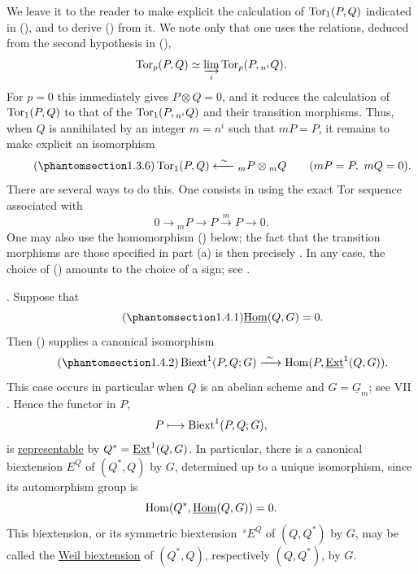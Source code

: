 We leave it to the reader to make explicit the calculation of
$\operatorname{Tor}_1(P,Q)$ indicated in (), and to derive () from it.
We note only that one uses the relations, deduced from the second
hypothesis in (),
\[
 \operatorname{Tor}_p(P,Q)\simeq
 \varinjlim_i\operatorname{Tor}_p(P,{}_{n^i}Q).
\]
For $p=0$ this immediately gives $P\otimes Q=0$, and it reduces the
calculation of $\operatorname{Tor}_1(P,Q)$ to that of the
$\operatorname{Tor}_1(P,{}_{n^i}Q)$ and their transition morphisms.  Thus, when
$Q$ is annihilated by an integer $m=n^i$ such that $mP=P$, it remains
to make explicit an isomorphism
\begin{equation}\tag{\SGARefTarget{sga7.sga7i.eviii.n1-3-6}{1.3.6}}
 \Tor_1(P,Q)
 \xleftarrow{\ \sim\ }
 {}_mP\otimes{}_mQ
 \qquad(mP=P,\ mQ=0).
\end{equation}
There are several ways to do this.  One consists in using the exact
Tor sequence associated with
\[
 0\longrightarrow{}_mP\longrightarrow P
 \xrightarrow{\ m\ }P\longrightarrow0.
\]
One may also use the homomorphism () below; the fact that the
transition morphisms are those specified in part (a) is then precisely
.  In any case, the choice of () amounts to the choice of a
sign; see .

. Suppose that
\begin{equation}\tag{\SGARefTarget{sga7.sga7i.eviii.n1-4-1}{1.4.1}}
 \uHom(Q,G)=0.
\end{equation}
Then () supplies a canonical isomorphism
\begin{equation}\tag{\SGARefTarget{sga7.sga7i.eviii.n1-4-2}{1.4.2}}
 \Biext^1(P,Q;G)
 \xrightarrow{\ \sim\ }
 \Hom(P,\uExt^1(Q,G)).
\end{equation}
This case occurs in particular when $Q$ is an abelian scheme and
$G=\underline G_m$; see VII .  Hence the functor in $P$,
\[
 P\longmapsto\operatorname{Biext}^1(P,Q;G),
\]
is \underline{representable} by $Q^*=\uExt^1(Q,G)$.  In particular,
there is a canonical biextension $E^Q$ of $(Q^*,Q)$ by $G$, determined
up to a unique isomorphism, since its automorphism group is
\[
 \Hom(Q^*,\uHom(Q,G))=0.
\]
This biextension, or its symmetric biextension $\,{}^sE^Q$ of
$(Q,Q^*)$ by $G$, may be called the \underline{Weil biextension} of
$(Q^*,Q)$, respectively $(Q,Q^*)$, by $G$.

